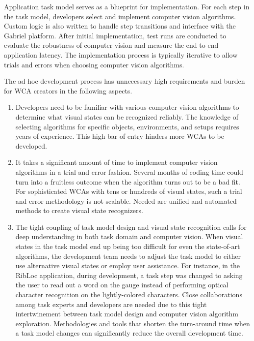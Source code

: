Application task model serves as a blueprint for implementation. For each step
in the task model, developers select and implement computer vision algorithms.
Custom logic is also written to handle step transitions and interface with the
Gabriel platform. After initial implementation, test runs are conducted to
evaluate the robustness of computer vision and measure the end-to-end
application latency. The implementation process is typically iterative to allow
trials and errors when choosing computer vision algorithms.

The ad hoc development process has unnecessary high requirements and burden for
WCA creators in the following aspects.
\begin{enumerate}
  \item Developers need to be familiar with various computer vision algorithms
to determine what visual states can be recognized reliably. The knowledge of
selecting algorithms for specific objects, environments, and setups requires
years of experience. This high bar of entry hinders more WCAs to be developed.
  \item It takes a significant amount of time to implement computer vision
algorithms in a trial and error fashion. Several months of coding time could
turn into a fruitless outcome when the algorithm turns out to be a bad fit. For
sophisticated WCAs with tens or hundreds of visual states, such a trial and
error methodology is not scalable. Needed are unified and automated methods to
create visual state recognizers.
  \item The tight coupling of task model design and visual state recognition
calls for deep understanding in both task domain and computer vision. When
visual states in the task model end up being too difficult for even the
state-of-art algorithms, the development team needs to adjust the task model to
either use alternative visual states or employ user assistance. For instance, in
the RibLoc application, during development, a task step was changed to asking
the user to read out a word on the gauge instead of performing optical character
recognition on the lightly-colored characters. Close collaborations among task
experts and developers are needed due to this tight intertwinement between task
model design and computer vision algorithm exploration. Methodologies and tools
that shorten the turn-around time when a task model changes can significantly
reduce the overall development time.
\end{enumerate}


